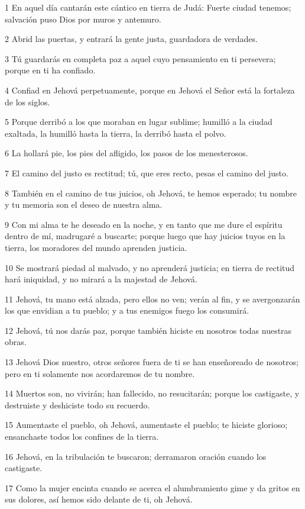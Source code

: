 \par 1 En aquel día cantarán este cántico en tierra de Judá: Fuerte ciudad tenemos; salvación puso Dios por muros y antemuro.
\par 2 Abrid las puertas, y entrará la gente justa, guardadora de verdades.
\par 3 Tú guardarás en completa paz a aquel cuyo pensamiento en ti persevera; porque en ti ha confiado.
\par 4 Confiad en Jehová perpetuamente, porque en Jehová el Señor está la fortaleza de los siglos.
\par 5 Porque derribó a los que moraban en lugar sublime; humilló a la ciudad exaltada, la humilló hasta la tierra, la derribó hasta el polvo.
\par 6 La hollará pie, los pies del afligido, los pasos de los menesterosos.
\par 7 El camino del justo es rectitud; tú, que eres recto, pesas el camino del justo.
\par 8 También en el camino de tus juicios, oh Jehová, te hemos esperado; tu nombre y tu memoria son el deseo de nuestra alma.
\par 9 Con mi alma te he deseado en la noche, y en tanto que me dure el espíritu dentro de mí, madrugaré a buscarte; porque luego que hay juicios tuyos en la tierra, los moradores del mundo aprenden justicia.
\par 10 Se mostrará piedad al malvado, y no aprenderá justicia; en tierra de rectitud hará iniquidad, y no mirará a la majestad de Jehová.
\par 11 Jehová, tu mano está alzada, pero ellos no ven; verán al fin, y se avergonzarán los que envidian a tu pueblo; y a tus enemigos fuego los consumirá. 
\par 12 Jehová, tú nos darás paz, porque también hiciste en nosotros todas nuestras obras.
\par 13 Jehová Dios nuestro, otros señores fuera de ti se han enseñoreado de nosotros; pero en ti solamente nos acordaremos de tu nombre.
\par 14 Muertos son, no vivirán; han fallecido, no resucitarán; porque los castigaste, y destruiste y deshiciste todo su recuerdo.
\par 15 Aumentaste el pueblo, oh Jehová, aumentaste el pueblo; te hiciste glorioso; ensanchaste todos los confines de la tierra.
\par 16 Jehová, en la tribulación te buscaron; derramaron oración cuando los castigaste.
\par 17 Como la mujer encinta cuando se acerca el alumbramiento gime y da gritos en sus dolores, así hemos sido delante de ti, oh Jehová.
